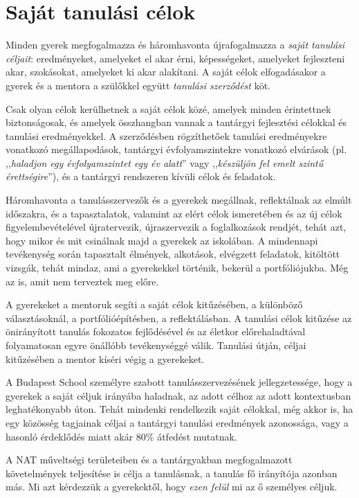 \section{Saját tanulási célok}
\label{sec:tanulasi_celok}

Minden gyerek megfogalmazza és háromhavonta újrafogalmazza a \emph{saját tanulási céljait}: eredményeket, amelyeket el akar érni, képességeket, amelyeket fejleszteni akar, szokásokat, amelyeket ki akar alakítani. A saját célok elfogadásakor a gyerek és a mentora a szülőkkel együtt \emph{tanulási szerződést} köt.

Csak olyan célok kerülhetnek a saját célok közé, amelyek minden érintettnek biztonságosak, és amelyek összhangban vannak a tantárgyi fejlesztési célokkal és tanulási eredményekkel. A szerződésben rögzíthetőek tanulási eredményekre vonatkozó megállapodások, tantárgyi évfolyamszintekre vonatkozó elvárások (pl. ,,\emph{haladjon egy évfolyamszintet egy év alatt}'' vagy ,,\emph{készüljön fel emelt szintű érettségire}''), és a tantárgyi rendszeren kívüli célok és feladatok.


Háromhavonta a tanulásszervezők és a gyerekek megállnak, reflektálnak az elmúlt időszakra, és a tapasztalatok, valamint az elért célok ismeretében és az új célok figyelembevételével újratervezik, újraszervezik a foglalkozások rendjét, tehát azt, hogy mikor és mit csinálnak majd a gyerekek az iskolában. A mindennapi tevékenység során tapasztalt élmények, alkotások, elvégzett feladatok, kitöltött vizsgák, tehát mindaz, ami a gyerekekkel történik, bekerül a portfóliójukba. Még az is, amit nem terveztek meg előre.

A gyerekeket a mentoruk segíti a saját célok kitűzésében, a különböző választásoknál, a portfólióépítésben, a reflektálásban. A tanulási célok kitűzése az önirányított tanulás fokozatos fejlődésével és az életkor előrehaladtával folyamatosan egyre önállóbb tevékenységgé válik. Tanulási útján, céljai kitűzésében a mentor kíséri végig a gyerekeket.

A Budapest School személyre szabott tanulásszervezésének jellegzetessége, hogy a gyerekek a saját céljuk irányába haladnak, az adott célhoz az adott kontextusban leghatékonyabb úton. Tehát mindenki rendelkezik saját célokkal, még akkor is, ha egy közösség tagjainak céljai a tantárgyi tanulási eredmények azonossága, vagy a hasonló érdeklődés miatt akár  80\% átfedést mutatnak.

A NAT műveltségi területeiben és a tantárgyakban megfogalmazott követelmények teljesítése is célja a tanulásnak, a tanulás fő irányítója azonban más. Mi azt kérdezzük a gyerekektől, hogy \emph{ezen felül} mi az ő személyes céljuk.